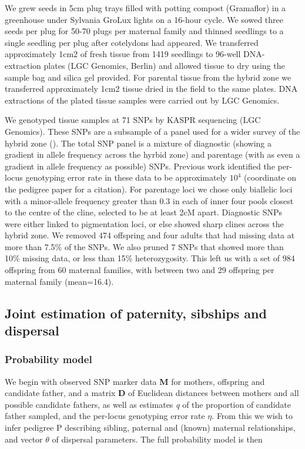 \documentclass[10pt, a4paper, twocolumn]{article} %
\begin{document}
We grew seeds in 5cm plug trays filled with potting compost (Gramaflor) in a greenhouse under Sylvania GroLux lights on a 16-hour cycle. We sowed three seeds per plug for 50-70 plugs per maternal family and thinned seedlings to a single seedling per plug after cotelydons had appeared. We transferred approximately 1cm2 of fresh tissue from 1419 seedlings to 96-well DNA-extraction plates (LGC Genomics, Berlin) and allowed tissue to dry using the sample bag and silica gel provided. For parental tissue from the hybrid zone we transferred approximately 1cm2 tissue dried in the field to the same plates. DNA extractions of the plated tissue samples were carried out by LGC Genomics.

We genotyped tissue samples at 71 SNPs by KASPR sequencing (LGC Genomics). These SNPs are a subsample of a panel used for a wider survey of the hybrid zone (\cite{surendranadh2022effects}). The total SNP panel is a mixture of  diagnostic (showing a gradient in allele frequency across the hyrbid zone) and parentage (with as even a gradient in allele frequency as possible) SNPs. Previous work identified the per-locus genotyping error rate in these data to be approximately $10^4$ (coordinate on the pedigree paper for a citation). For parentage loci we chose only biallelic loci with a minor-allele frequency greater than 0.3 in each of inner four pools closest to the centre of the cline, selected to be at least 2cM apart. Diagnostic SNPs were either linked to pigmentation loci, or else showed sharp clines across the hybrid zone. We removed 474 offspring and four adults that had missing data at more than 7.5\% of the SNPs. We also pruned 7 SNPs that showed more than 10\% missing data, or less than 15\% heterozygosity. This left us with a set of 984 offspring from 60 maternal families, with between two and 29 offspring per maternal family (mean=16.4).

\subsection{Joint estimation of paternity, sibships and dispersal}

\subsubsection{Probability model}

We begin with observed SNP marker data \textbf{M} for mothers, offspring and candidate father, and a matrix \textbf{D} of Euclidean distances between mothers and all possible candidate fathers, as well as estimates \textit{q} of the proportion of candidate father sampled, and the per-locus genotyping error rate $\eta$. From this we wish to infer pedigree P describing sibling, paternal and (known) maternal relationships, and vector $\theta$ of dispersal parameters. The full probability model is then
\end{document}
